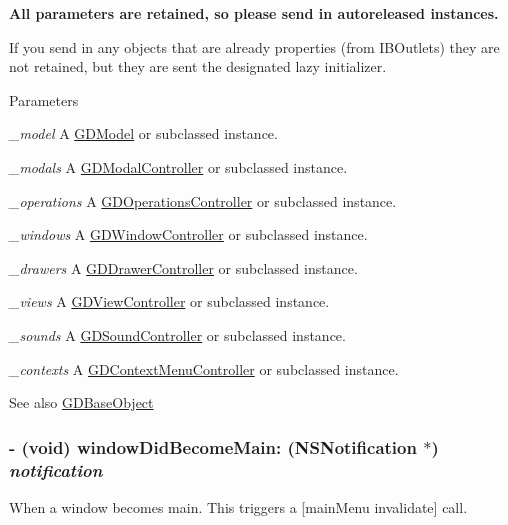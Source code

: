 {\bfseries All parameters are retained, so please send in autoreleased instances.}

If you send in any objects that are already properties (from IBOutlets) they are not retained, but they are sent the designated lazy initializer.


\begin{DoxyParams}{Parameters}
\item[{\em \_\-model}]A \hyperlink{interface_g_d_model}{GDModel} or subclassed instance. \item[{\em \_\-modals}]A \hyperlink{interface_g_d_modal_controller}{GDModalController} or subclassed instance. \item[{\em \_\-operations}]A \hyperlink{interface_g_d_operations_controller}{GDOperationsController} or subclassed instance. \item[{\em \_\-windows}]A \hyperlink{interface_g_d_window_controller}{GDWindowController} or subclassed instance. \item[{\em \_\-drawers}]A \hyperlink{interface_g_d_drawer_controller}{GDDrawerController} or subclassed instance. \item[{\em \_\-views}]A \hyperlink{interface_g_d_view_controller}{GDViewController} or subclassed instance. \item[{\em \_\-sounds}]A \hyperlink{interface_g_d_sound_controller}{GDSoundController} or subclassed instance. \item[{\em \_\-contexts}]A \hyperlink{interface_g_d_context_menu_controller}{GDContextMenuController} or subclassed instance.\end{DoxyParams}
\begin{DoxySeeAlso}{See also}
\hyperlink{interface_g_d_base_object}{GDBaseObject} 
\end{DoxySeeAlso}
\hypertarget{interface_g_d_document_a98f524279b07ab6e5e988206c2f6924e}{
\subsubsection[{windowDidBecomeMain:}]{\setlength{\rightskip}{0pt plus 5cm}-\/ (void) windowDidBecomeMain: (NSNotification $\ast$) {\em notification}}}
\label{interface_g_d_document_a98f524279b07ab6e5e988206c2f6924e}


When a window becomes main. This triggers a \mbox{[}mainMenu invalidate\mbox{]} call. 

